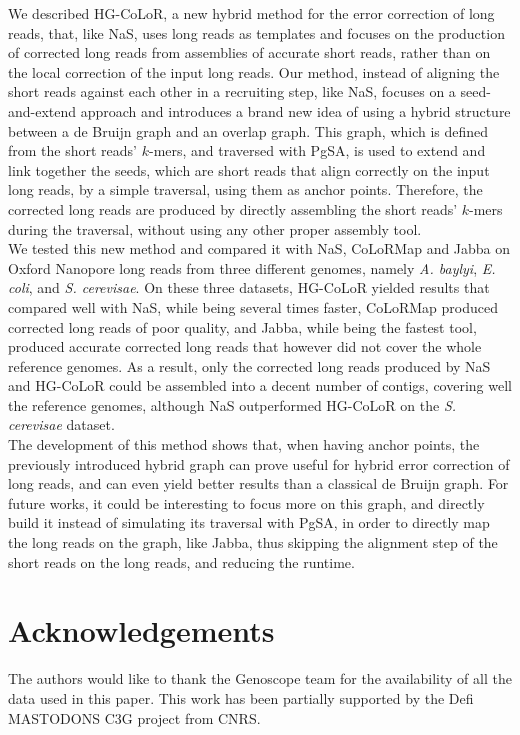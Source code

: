 \documentclass[long, final]{jobim2017}
\begin{document}
We described HG-CoLoR, a new hybrid method for the error correction of long reads, that, like NaS, uses long reads as templates and focuses on the production of corrected long reads from assemblies of accurate short reads, rather than on the local correction of the input long reads. Our method, instead of aligning the short reads against each other in a recruiting step, like NaS, focuses on a seed-and-extend approach and introduces a brand new idea of using a hybrid structure between a de Bruijn graph and an overlap graph. This graph, which is defined from the short reads' $k$-mers, and traversed with PgSA, is used to extend and link together the seeds, which are short reads that align correctly on the input long reads, by a simple traversal, using them as anchor points. Therefore, the corrected long reads are produced by directly assembling the short reads' $k$-mers during the traversal, without using any other proper assembly tool. \\
\indent We tested this new method and compared it with NaS, CoLoRMap and Jabba on Oxford Nanopore long reads from three different genomes, namely \emph{A. baylyi}, \emph{E. coli}, and \emph{S. cerevisae}. On these three datasets, HG-CoLoR yielded results that compared well with NaS, while being several times faster, CoLoRMap produced corrected long reads of poor quality, and Jabba, while being the fastest tool, produced accurate corrected long reads that however did not cover the whole reference genomes. As a result, only the corrected long reads produced by NaS and HG-CoLoR could be assembled into a decent number of contigs, covering well the reference genomes, although NaS outperformed HG-CoLoR on the \emph{S. cerevisae} dataset. \\
\indent The development of this method shows that, when having anchor points, the previously introduced hybrid graph can prove useful for hybrid error correction of long reads, and can even yield better results than a classical de Bruijn graph. For future works, it could be interesting to focus more on this graph, and directly build it instead of simulating its traversal with PgSA, in order to directly map the long reads on the graph, like Jabba, thus skipping the alignment step of the short reads on the long reads, and reducing the runtime.

\section*{Acknowledgements}

The authors would like to thank the Genoscope team for the availability of all the data used in this paper.
This work has been partially supported by the Defi MASTODONS C3G project from CNRS.


\end{document}
